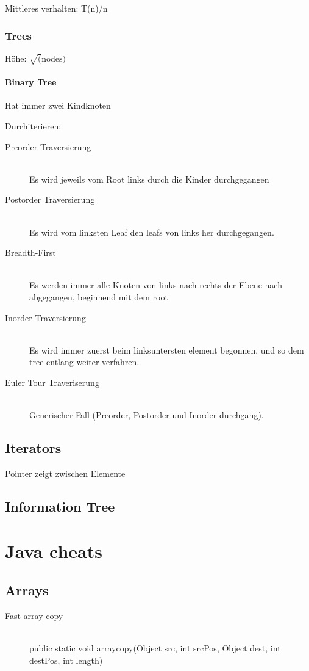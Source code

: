 Mittleres verhalten: T(n)/n


\subsubsection{Trees}

Höhe: $\sqrt(\text{nodes})$


\paragraph{Binary Tree}

Hat immer zwei Kindknoten

Durchiterieren:
\begin{description}
	\item[Preorder Traversierung] \hfill \\
		Es wird jeweils vom Root links durch die Kinder durchgegangen
	\item[Postorder Traversierung] \hfill \\
		Es wird vom linksten Leaf den leafs von links her durchgegangen.
	\item[Breadth-First]\hfill \\
		Es werden immer alle Knoten von links nach rechts der Ebene nach abgegangen, beginnend mit dem root
	\item[Inorder Traversierung] \hfill \\
		Es wird immer zuerst beim linksuntersten element begonnen, und so dem tree entlang weiter verfahren.
	\item[Euler Tour Traveriserung] \hfill \\
		Generischer Fall (Preorder, Postorder und Inorder durchgang).
\end{description}

\subsection{Iterators}

Pointer zeigt zwischen Elemente

\subsection{Information Tree}



\section{Java cheats}
\subsection{Arrays}
\begin{description}
	
	\item[Fast array copy] \hfill \\
		public static void arraycopy(Object src, int srcPos, Object dest, int destPos, int length)

\end{description}
